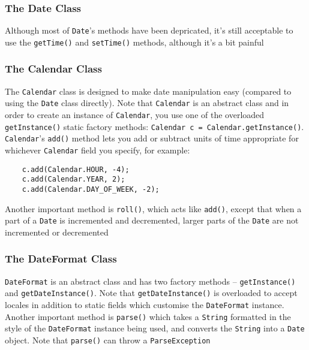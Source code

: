 \subsubsection{The Date Class}
Although most of \verb#Date#'s methods have been depricated, it's still 
acceptable to use the \verb#getTime()# and \verb#setTime()# methods, although 
it's a bit painful

\subsubsection{The Calendar Class}
The \verb#Calendar# class is designed to make date manipulation easy (compared to 
using the \verb#Date# class directly). Note that \verb#Calendar# is an abstract 
class and in order to create an instance of \verb#Calendar#, you use one of the 
overloaded \verb#getInstance()# static factory methods:
\verb#Calendar c = Calendar.getInstance()#. \verb#Calendar#'s \verb#add()# 
method lets you add or subtract units of time appropriate for whichever 
\verb#Calendar# field you specify, for example:
\begin{verbatim}
    c.add(Calendar.HOUR, -4);
    c.add(Calendar.YEAR, 2);
    c.add(Calendar.DAY_OF_WEEK, -2);
\end{verbatim}
Another important method is \verb#roll()#, which acts like \verb#add()#, except 
that when a part of a \verb#Date# is incremented and decremented, larger parts 
of the \verb#Date# are not incremented or decremented

\subsubsection{The DateFormat Class}
\verb#DateFormat# is an abstract class and has two factory methods -- 
\verb#getInstance()# and \verb#getDateInstance()#. Note that 
\verb#getDateInstance()# is overloaded to accept locales in addition to static 
fields which customise the \verb#DateFormat# instance. Another important method 
is \verb#parse()# which takes a \verb#String# formatted in the style of the 
\verb#DateFormat# instance being used, and converts the \verb#String# into a 
\verb#Date# object. Note that \verb#parse()# can throw a \verb#ParseException#

